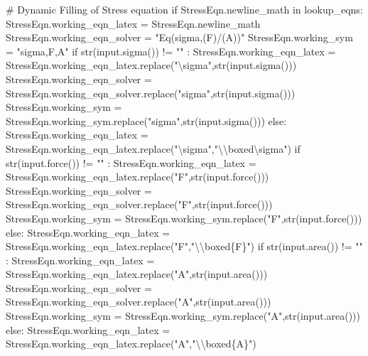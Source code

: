 \documentclass[
  letterpaper,
  DIV=11,
  numbers=noendperiod]{scrreprt}
\newenvironment{Shaded}{\begin{snugshade}}{\end{snugshade}}
\newcommand{\NormalTok}[1]{\textcolor[rgb]{0.00,0.23,0.31}{#1}}
\begin{document}
\begin{Shaded}
\begin{Highlighting}[]
\NormalTok{        \# Dynamic Filling of Stress equation }
\NormalTok{        if StressEqn.newline\_math in lookup\_eqns:}
\NormalTok{            StressEqn.working\_eqn\_latex = StressEqn.newline\_math}
\NormalTok{            StressEqn.working\_eqn\_solver = "Eq(sigma,(F)/(A))"}
\NormalTok{            StressEqn.working\_sym = "sigma,F,A"}
\NormalTok{            if str(input.sigma()) != "" : }
\NormalTok{                StressEqn.working\_eqn\_latex = StressEqn.working\_eqn\_latex.replace("\textbackslash{}sigma",str(input.sigma()))}
\NormalTok{                StressEqn.working\_eqn\_solver = StressEqn.working\_eqn\_solver.replace("sigma",str(input.sigma()))}
\NormalTok{                StressEqn.working\_sym = StressEqn.working\_sym.replace("sigma",str(input.sigma()))}
\NormalTok{            else:}
\NormalTok{                StressEqn.working\_eqn\_latex = StressEqn.working\_eqn\_latex.replace("\textbackslash{}sigma","\textbackslash{}\textbackslash{}boxed\textbackslash{}sigma")}
\NormalTok{            if str(input.force()) != "" : }
\NormalTok{                StressEqn.working\_eqn\_latex = StressEqn.working\_eqn\_latex.replace("F",str(input.force()))}
\NormalTok{                StressEqn.working\_eqn\_solver = StressEqn.working\_eqn\_solver.replace("F",str(input.force()))}
\NormalTok{                StressEqn.working\_sym = StressEqn.working\_sym.replace("F",str(input.force()))}
\NormalTok{            else:}
\NormalTok{                StressEqn.working\_eqn\_latex = StressEqn.working\_eqn\_latex.replace("F","\textbackslash{}\textbackslash{}boxed\{F\}")}
\NormalTok{            if str(input.area()) != "" : }
\NormalTok{                StressEqn.working\_eqn\_latex = StressEqn.working\_eqn\_latex.replace("A",str(input.area()))}
\NormalTok{                StressEqn.working\_eqn\_solver = StressEqn.working\_eqn\_solver.replace("A",str(input.area()))}
\NormalTok{                StressEqn.working\_sym = StressEqn.working\_sym.replace("A",str(input.area()))}
\NormalTok{            else:}
\NormalTok{                StressEqn.working\_eqn\_latex = StressEqn.working\_eqn\_latex.replace("A","\textbackslash{}\textbackslash{}boxed\{A\}")}
           


\end{Highlighting}
\end{Shaded}
\end{document}

